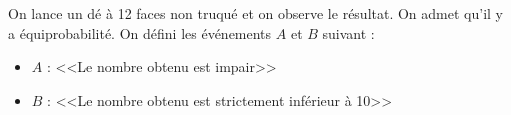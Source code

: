 	On lance un dé à 12 faces non truqué et on observe le résultat. On admet qu'il y a équiprobabilité. On défini les événements $A$ et $B$ suivant :

\begin{itemize}
	\item $A$ : <<Le nombre obtenu est impair>>
	\item $B$ : <<Le nombre obtenu est strictement inférieur à 10>>
\end{itemize} 

